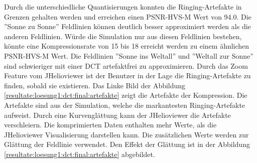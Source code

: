 Durch die unterschiedliche Quantisierungen konnten die Ringing-Artefakte in Grenzen gehalten werden und erreichen einen PSNR-HVS-M  Wert von 94.0. Die ''Sonne zu Sonne'' Feldlinien können deutlich besser approximiert werden als die anderen Feldlinien. Würde die Simulation nur aus diesen Feldlinien bestehen, könnte eine Kompressionsrate von 15 bis 18 erreicht werden zu einem ähnlichen PSNR-HVS-M Wert. Die Feldlinien ''Sonne ins Weltall'' und ''Weltall zur Sonne'' sind schwieriger mit einer DCT artefaktfrei zu approximieren.  Durch das Zoom Feature vom JHelioviewer ist der Benutzer in der Lage die Ringing-Artefakte zu finden, sobald sie existieren. Das Linke Bild der Abbildung \ref{resultate:loesung1:dct:final:artefakte} zeigt die Artefakte der Kompression. Die Artefakte sind aus der Simulation, welche die markantesten Ringing-Artefakte aufweist. Durch eine Kurvenglättung kann der JHelioviewer die Artefakte verschleiern. Die komprimierten Daten enthalten mehr Werte, als die JHelioviewer Visualisierung darstellen kann. Die zusätzlichen Werte werden zur Glättung der Feldlinie verwendet. Den Effekt der Glättung ist in der Abbildung \ref{resultate:loesung1:dct:final:artefakte} abgebildet.

